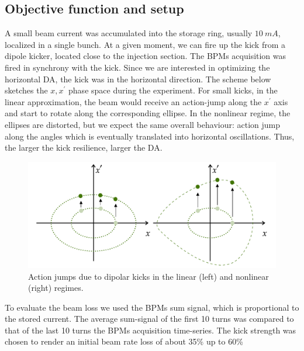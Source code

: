 \subsection{Objective function and setup}
A small beam current was accumulated into the storage ring, usually $10~\unit{mA}$, localized in a single bunch. At a given moment, we can fire up the kick from a dipole kicker, located close to the injection section. The BPMs acquisition was fired in synchrony with the kick. Since we are interested in optimizing the horizontal DA, the kick was in the horizontal direction. The scheme below sketches the $x,x^\prime$ phase space during the experiment. For small kicks, in the linear approximation, the beam would receive an action-jump along the $x^\prime$ axis and start to rotate along the corresponding ellipse. In the nonlinear regime, the ellipses are distorted, but we expect the same overall behaviour: action jump along the angles which is eventually translated into horizontal oscillations. Thus, the larger the kick resilience, larger the DA.
\begin{figure}
    \centering
    \includegraphics[width=\textwidth]{Images/phase_space_kick.pdf}
    \caption[Action jumps due to dipolar kicks in the linear and nonlinear regimes.]{Action jumps due to dipolar kicks in the linear (left) and nonlinear (right) regimes.}
\end{figure}
To evaluate the beam loss we used the BPMs sum signal, which is proportional to the stored current. The average sum-signal of the first 10 turns was compared to that of the last 10 turns the BPMs acquisition time-series. The kick strength was chosen to render an initial beam rate loss of about 35\% up to 60\%
